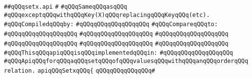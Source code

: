 \label{src/lib/src/setx.api}
\verb|##qQQqsetx.api|\newline
\verb|#|\newline
\verb|#qQQqSameqQQqasqQQq|\newline
\verb|#qQQqexceptqQQqwithqQQqKey(X)qQQqreplacingqQQqKeyqQQq(etc).|\newline
\newline
\verb|#qQQqCompiledqQQqby:|\newline
\verb|#qQQqqQQqqQQqqQQqqQQq|\newline
\newline
\verb|#qQQqCompareqQQqto:|\newline
\verb|#qQQqqQQqqQQqqQQqqQQq|\newline
\verb|#qQQqqQQqqQQqqQQqqQQq|\newline
\verb|#qQQqqQQqqQQqqQQqqQQq|\newline
\verb|#qQQqqQQqqQQqqQQqqQQq|\newline
\verb|#qQQqqQQqqQQqqQQqqQQq|\newline
\verb|#qQQqqQQqqQQqqQQqqQQq|\newline
\newline
\verb|#qQQqThisqQQqapiqQQqisqQQqimplementedqQQqin:|\newline
\verb|#qQQqqQQqqQQqqQQqqQQq|\newline
\newline
\newline
\newline
\newline
\verb|#qQQqApiqQQqforqQQqaqQQqsetqQQqofqQQqvaluesqQQqwithqQQqanqQQqorderqQQqrelation.|\newline
\newline
\newline
\newline
\verb|apiqQQqSetxqQQq{|\newline
\verb|qQQqqQQqqQQqqQQq#|\newline
